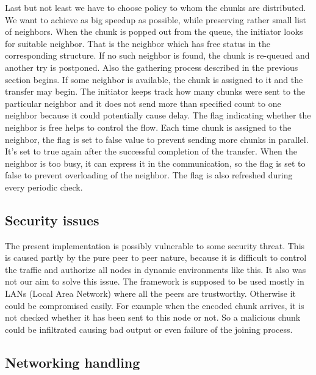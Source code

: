 Last but not least we have to choose policy to whom the chunks are
distributed. We want to achieve as big speedup as possible, while
preserving rather small list of neighbors. When the chunk is popped out
from the queue, the initiator looks for suitable neighbor. That is the
neighbor which has free status in the corresponding structure. If no
such neighbor is found, the chunk is re-queued and another try is
postponed. Also the gathering process described in the previous section
begins. If some neighbor is available, the chunk is assigned to it and
the transfer may begin. The initiator keeps track how many chunks were
sent to the particular neighbor and it does not send more than specified
count to one neighbor because it could potentially cause delay. The flag
indicating whether the neighbor is free helps to control the flow. Each
time chunk is assigned to the neighbor, the flag is set to false value
to prevent sending more chunks in parallel. It's set to true again after
the successful completion of the transfer. When the neighbor is too
busy, it can express it in the communication, so the flag is set to
false to prevent overloading of the neighbor. The flag is also refreshed
during every periodic check.

\subsection{Security issues}\label{security-issues}

The present implementation is possibly vulnerable to some security
threat. This is caused partly by the pure peer to peer nature, because
it is difficult to control the traffic and authorize all nodes in
dynamic environments like this. It also was not our aim to solve this
issue. The framework is supposed to be used mostly in LANs (Local Area
Network) where all the peers are trustworthy. Otherwise it could be
compromised easily. For example when the encoded chunk arrives, it is
not checked whether it has been sent to this node or not. So a malicious
chunk could be infiltrated causing bad output or even failure of the
joining process.

\subsection{Networking handling}\label{networking-handling}

